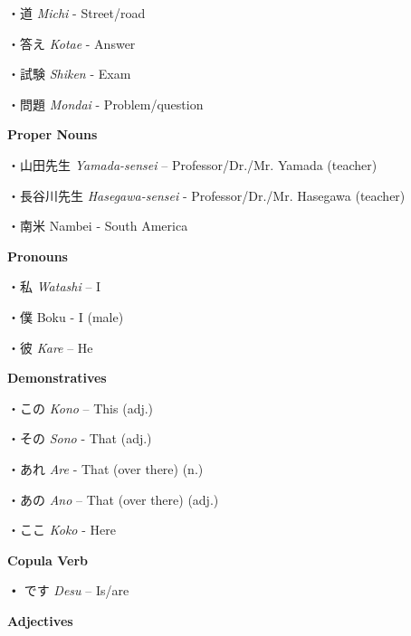 \par{・道 \emph{Michi }- Street\slash road }

\par{・答え \emph{Kotae }- Answer }

\par{・試験 \emph{Shiken }- Exam }

\par{・問題 \emph{Mondai }- Problem\slash question }

\par{\textbf{Proper Nouns }}

\par{・山田先生 \emph{Yamada-sensei }– Professor\slash Dr.\slash Mr. Yamada (teacher) }

\par{・長谷川先生 \emph{Hasegawa-sensei }- Professor\slash Dr.\slash Mr. Hasegawa (teacher) }

\par{・南米 Nambei - South America }

\par{\textbf{Pronouns }}

\par{・私 \emph{Watashi }– I }

\par{・僕 Boku - I (male) }

\par{・彼 \emph{Kare }– He }

\par{\textbf{Demonstratives }}

\par{・この \emph{Kono }– This (adj.) }

\par{・その \emph{Sono }- That (adj.) }

\par{・あれ \emph{Are }- That (over there) (n.) }

\par{・あの \emph{Ano }– That (over there) (adj.) }

\par{・ここ \emph{Koko }- Here }

\par{\textbf{Copula Verb }}

\par{ \textbf{・ }です \emph{Desu }– Is\slash are \hfill\break
}
 
\par{ \textbf{Adjectives }\hfill\break
}
 
